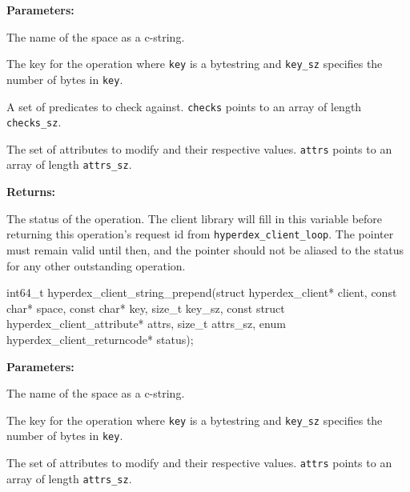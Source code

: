 \noindent\textbf{Parameters:}
\begin{description}[labelindent=\widthof{{\texttt{checks}, \texttt{checks\_sz}}},leftmargin=*,noitemsep,nolistsep,align=right]
\item[\texttt{space}] The name of the space as a c-string.
\item[\texttt{key}, \texttt{key\_sz}] The key for the operation where \texttt{key} is a bytestring and \texttt{key\_sz} specifies the number of bytes in \texttt{key}.
\item[\texttt{checks}, \texttt{checks\_sz}] A set of predicates to check against.  \texttt{checks} points to an array of length \texttt{checks\_sz}.
\item[\texttt{attrs}, \texttt{attrs\_sz}] The set of attributes to modify and their respective values.  \texttt{attrs} points to an array of length \texttt{attrs\_sz}.
\end{description}

\noindent\textbf{Returns:}
\begin{description}[labelindent=\widthof{{\texttt{status}}},leftmargin=*,noitemsep,nolistsep,align=right]
\item[\texttt{status}] The status of the operation.  The client library will fill in this variable before returning this operation's request id from \texttt{hyperdex\_client\_loop}.  The pointer must remain valid until then, and the pointer should not be aliased to the status for any other outstanding operation.
\end{description}

\funcsep
\begin{ccode}
int64_t hyperdex_client_string_prepend(struct hyperdex_client* client,
                const char* space,
                const char* key, size_t key_sz,
                const struct hyperdex_client_attribute* attrs, size_t attrs_sz,
                enum hyperdex_client_returncode* status);
\end{ccode}
\funcdesc 

\noindent\textbf{Parameters:}
\begin{description}[labelindent=\widthof{{\texttt{attrs}, \texttt{attrs\_sz}}},leftmargin=*,noitemsep,nolistsep,align=right]
\item[\texttt{space}] The name of the space as a c-string.
\item[\texttt{key}, \texttt{key\_sz}] The key for the operation where \texttt{key} is a bytestring and \texttt{key\_sz} specifies the number of bytes in \texttt{key}.
\item[\texttt{attrs}, \texttt{attrs\_sz}] The set of attributes to modify and their respective values.  \texttt{attrs} points to an array of length \texttt{attrs\_sz}.
\end{description}

